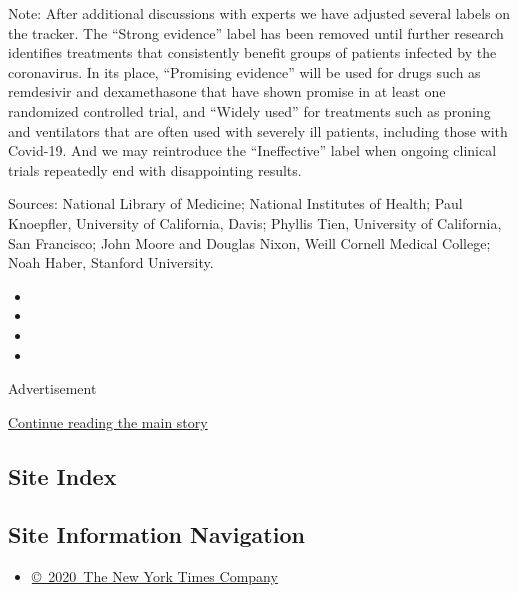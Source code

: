 Note: After additional discussions with experts we have adjusted several
labels on the tracker. The ``Strong evidence'' label has been removed
until further research identifies treatments that consistently benefit
groups of patients infected by the coronavirus. In its place,
``Promising evidence'' will be used for drugs such as remdesivir and
dexamethasone that have shown promise in at least one randomized
controlled trial, and ``Widely used'' for treatments such as proning and
ventilators that are often used with severely ill patients, including
those with Covid-19. And we may reintroduce the ``Ineffective'' label
when ongoing clinical trials repeatedly end with disappointing results.

Sources: National Library of Medicine; National Institutes of Health;
Paul Knoepfler, University of California, Davis; Phyllis Tien,
University of California, San Francisco; John Moore and Douglas Nixon,
Weill Cornell Medical College; Noah Haber, Stanford University.

\begin{itemize}
\item
\item
\item
\item
\end{itemize}

Advertisement

\protect\hyperlink{after-bottom}{Continue reading the main story}

\hypertarget{site-index}{%
\subsection{Site Index}\label{site-index}}

\hypertarget{site-information-navigation}{%
\subsection{Site Information
Navigation}\label{site-information-navigation}}

\begin{itemize}
\tightlist
\item
  \href{https://help.nytimes3xbfgragh.onion/hc/en-us/articles/115014792127-Copyright-notice}{©~2020~The
  New York Times Company}
\end{itemize}

